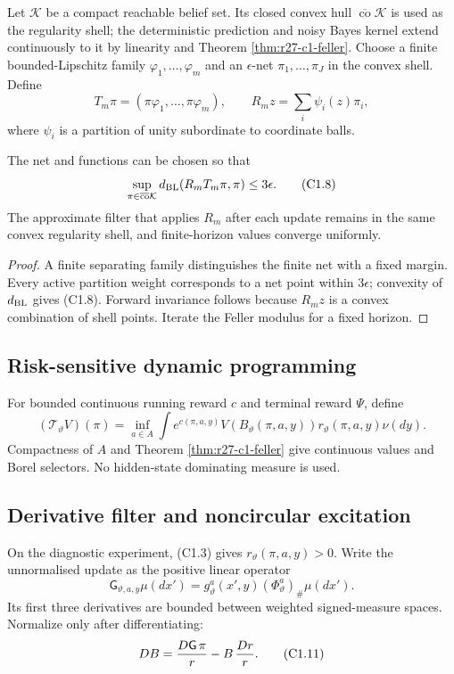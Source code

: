 Let $\mathcal K$ be a compact reachable belief set.  Its closed convex hull
$\overline{\operatorname{co}}\mathcal K$ is used as the regularity shell; the
deterministic prediction and noisy Bayes kernel extend continuously to it by
linearity and Theorem \ref{thm:r27-c1-feller}.  Choose a finite
bounded-Lipschitz family $\varphi_1,\ldots,\varphi_m$ and an $\epsilon$-net
$\pi_1,\ldots,\pi_J$ in the convex shell.  Define
\[
 T_m\pi=(\pi\varphi_1,\ldots,\pi\varphi_m),\qquad
 R_mz=\sum_i\psi_i(z)\pi_i,                               \tag{C1.7}
\]
where $\psi_i$ is a partition of unity subordinate to coordinate balls.

\begin{proposition}
\label{prop:r27-c1-finite}
The net and functions can be chosen so that
\[
 \sup_{\pi\in\overline{\operatorname{co}}\mathcal K}
 d_{\rm BL}(R_mT_m\pi,\pi)\le3\epsilon.                   \tag{C1.8}
\]
The approximate filter that applies $R_m$ after each update remains in the
same convex regularity shell, and finite-horizon values converge uniformly.
\end{proposition}

\begin{proof}
A finite separating family distinguishes the finite net with a fixed margin.
Every active partition weight corresponds to a net point within
$3\epsilon$; convexity of $d_{\rm BL}$ gives (C1.8).  Forward invariance follows
because $R_mz$ is a convex combination of shell points.  Iterate the Feller
modulus for a fixed horizon.
\end{proof}

\subsection{Risk-sensitive dynamic programming}

For bounded continuous running reward $c$ and terminal reward $\Psi$, define
\[
 (\mathcal T_\vartheta V)(\pi)
 =\inf_{a\in A}\int e^{c(\pi,a,y)}
 V(B_\vartheta(\pi,a,y))r_\vartheta(\pi,a,y)\nu(dy).       \tag{C1.9}
\]
Compactness of $A$ and Theorem \ref{thm:r27-c1-feller} give continuous values
and Borel selectors.  No hidden-state dominating measure is used.

\subsection{Derivative filter and noncircular excitation}

On the diagnostic experiment, (C1.3) gives $r_\vartheta(\pi,a,y)>0$.  Write
the unnormalised update as the positive linear operator
\[
 \mathsf G_{\vartheta,a,y}\mu(dx')
 =g_\vartheta^a(x',y)(\Phi_\vartheta^a)_\#\mu(dx').        \tag{C1.10}
\]
Its first three derivatives are bounded between weighted signed-measure
spaces.  Normalize only after differentiating:
\[
 D B={D\mathsf G\,\pi\over r}
      -B\,{D r\over r}.                                   \tag{C1.11}
\]

